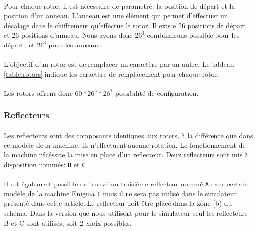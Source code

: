 \documentclass[letterpaper]{article}
\begin{document}
\paragraph{}

Pour chaque rotor, il est nécessaire de parametré: la position de départ et la position d'un anneau. L'anneau est une élément qui permet d'effectuer un décalage dans le chiffrement qu'effectue le rotor. Il existe 26 positions de départ et 26 positions d'anneau. Nous avons donc $26^3$ combinaisons possible pour les départs et $26^3$ pour les anneaux.

\paragraph{}
L'objectif d'un rotor est de remplacer un caractère par un autre. Le tableau \ref{table:rotors}  indique les caractère de remplacement pour chaque rotor.

\paragraph{}
Les rotors offrent donc $60*26^3*26^3$ possibilité de configuration.

\subsubsection{Reflecteurs}
\paragraph{}
Les reflecteurs sont des composants identiques aux rotors, à la différence que dans ce modèle de la machine, ils n'effectuent aucune rotation. Le fonctionnement de la machine nécéssite la mise en place d'un reflecteur. Deux reflecteurs sont mis à disposition nommés: \texttt{B} et \texttt{C}.

\paragraph{}

Il est également possible de trouvé un troisième reflecteur nommé \texttt{A} dans certain modèle de la machine Enigma \texttt{I} mais il ne sera pas utilisé dans le simulateur présenté dans cette article. Le reflecteur doit être placé dans la zone (b) du schéma. Dans la version que nous utilisont pour le simulateur seul les reflecteurs B et C sont utilisés, soit 2 choix possibles.
\end{document}
